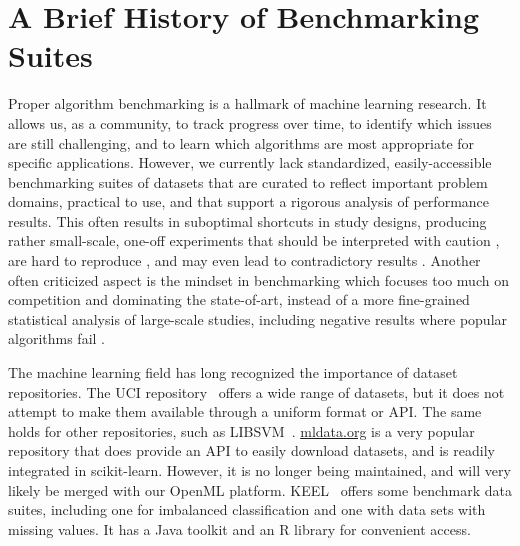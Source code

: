 \documentclass[twoside,11pt]{article}
\begin{document}



\section{A Brief History of Benchmarking Suites}
\label{sec:intro}


Proper algorithm benchmarking is a hallmark of machine learning research. It allows us, as a community, to track progress over time, to identify which issues are still challenging, and to learn which algorithms are most appropriate for specific applications. However, we currently lack standardized, easily-accessible benchmarking suites of datasets that are curated to reflect important problem domains, practical to use, and that support a rigorous analysis of performance results.
This often results in suboptimal shortcuts in study designs, producing rather small-scale, one-off experiments that should be interpreted with caution \citep{Aha:1992p455}, are hard to reproduce \citep{Pedersen:2008p12980,Hirsh:2008p14360}, and may even lead to contradictory results \citep{Keogh:2003p4930}. Another often criticized aspect is the mindset in benchmarking which focuses too much on competition and dominating the state-of-art, instead of a more fine-grained statistical analysis of large-scale studies, including negative results where popular algorithms fail \citep{sculley2018winner}.

The machine learning field has long recognized the importance of dataset repositories. The UCI repository~\citep{Lichman:2013} offers a wide range of datasets, but it does not attempt to make them available through a uniform format or API. The same holds for other repositories, such as LIBSVM~\citep{chang2011libsvm}. \url{mldata.org} is a very popular repository that does provide an API to easily download datasets, and is readily integrated in scikit-learn. However, it is no longer being maintained, and will very likely be merged with our OpenML platform. %
KEEL~\citep{KEEL} offers some benchmark data suites, including one for imbalanced classification and one with data sets with missing values. It has a Java toolkit and an R library for convenient access. 
\end{document}
